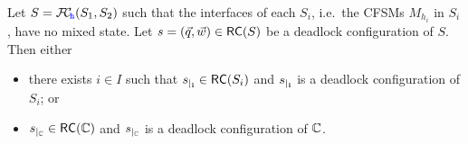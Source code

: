 \begin{lemma}
\label{lem:weakdfpreservation}
Let $S = {\mathcal{F}\!\mathcal{C}}_{\!{\mathtt{\color{blue}{ {h}}}}}(S_1,S_2)$ such that the interfaces of each $S_i$,
i.e.\ the CFSMs $M_{h_i}$ in $S_i$, have no mixed state.
Let $s= (\vec{q},\vec{w}) \in \mathsf{RC}(S)$ be a deadlock configuration of $S$.
Then either 
\begin{itemize}
\item
there exists $i\in I$ such that ${s}_{\mid_{\mathbf{i}}}\in \mathsf{RC}(S_i)$ and ${s}_{\mid_{\mathbf{i}}}$
is a deadlock configuration of $S_i$; or
\item
${s}_{\mid_{\mathbf{\mathbb{C}}}}\in \mathsf{RC}(\mathbb{C})$ and ${s}_{\mid_{\mathbf{\mathbb{C}}}}$
is a deadlock configuration of $\mathbb{C}$.
\end{itemize}
\end{lemma}

